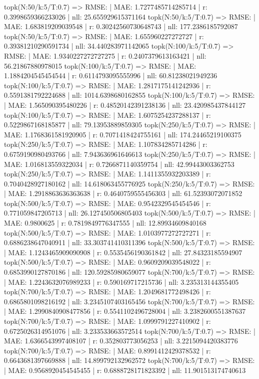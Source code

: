 topk(N:50/k:5/T:0.7) => RMSE: | MAE: 1.7277485714285714 | r: 0.3998659366233026 | nll: 25.655929615371164
topk(N:50/k:5/T:0.7) => RMSE: | MAE: 1.683819209039548 | r: 0.30242560730648743 | nll: 177.2386185792087
topk(N:50/k:5/T:0.7) => RMSE: | MAE: 1.655960227272727 | r: 0.39381210290591734 | nll: 34.440283971142065
topk(N:100/k:5/T:0.7) => RMSE: | MAE: 1.9340227272727275 | r: 0.2407379613163421 | nll: 56.21867880978015
topk(N:100/k:5/T:0.7) => RMSE: | MAE: 1.1884204545454544 | r: 0.6114793095555996 | nll: 60.81238021949236
topk(N:100/k:5/T:0.7) => RMSE: | MAE: 1.2817175141242936 | r: 0.5591381792224688 | nll: 1014.6398680162855
topk(N:100/k:5/T:0.7) => RMSE: | MAE: 1.565090395480226 | r: 0.48520142391238136 | nll: 23.420985437844127
topk(N:100/k:5/T:0.7) => RMSE: | MAE: 1.6075254237288137 | r: 0.5229867168185877 | nll: 79.13953889859305
topk(N:250/k:5/T:0.7) => RMSE: | MAE: 1.1768361581920905 | r: 0.7071418424755161 | nll: 174.24465219100375
topk(N:250/k:5/T:0.7) => RMSE: | MAE: 1.107834285714286 | r: 0.6759190980493766 | nll: 7.943636961646613
topk(N:250/k:5/T:0.7) => RMSE: | MAE: 1.016813559322034 | r: 0.7266871140359754 | nll: 42.99443003362753
topk(N:250/k:5/T:0.7) => RMSE: | MAE: 1.1411355932203389 | r: 0.7040428927180162 | nll: 14.618063455776925
topk(N:250/k:5/T:0.7) => RMSE: | MAE: 1.2918863636363638 | r: 0.4640759555456303 | nll: 61.52393072071852
topk(N:500/k:5/T:0.7) => RMSE: | MAE: 0.9542329545454546 | r: 0.771059847205713 | nll: 26.127450506805403
topk(N:500/k:5/T:0.7) => RMSE: | MAE: 0.9800625 | r: 0.7819849776347555 | nll: 12.89934609840168
topk(N:500/k:5/T:0.7) => RMSE: | MAE: 1.0103977272727271 | r: 0.6886238647040911 | nll: 33.303741410311396
topk(N:500/k:5/T:0.7) => RMSE: | MAE: 1.1243465909090908 | r: 0.5535456190361842 | nll: 27.84323185594907
topk(N:500/k:5/T:0.7) => RMSE: | MAE: 0.9609209039548022 | r: 0.6853990127870186 | nll: 120.59285980659077
topk(N:700/k:5/T:0.7) => RMSE: | MAE: 1.2243632076989233 | r: 0.590169717215736 | nll: 3.235313144355405
topk(N:700/k:5/T:0.7) => RMSE: | MAE: 1.2049681772498426 | r: 0.6865801098216192 | nll: 3.2345107403165456
topk(N:700/k:5/T:0.7) => RMSE: | MAE: 1.2990840908477856 | r: 0.5541102496728004 | nll: 3.2382600551387637
topk(N:700/k:5/T:0.7) => RMSE: | MAE: 1.0999791227410902 | r: 0.6725026314951076 | nll: 3.233533663572514
topk(N:700/k:5/T:0.7) => RMSE: | MAE: 1.6366543997408107 | r: 0.352803773056253 | nll: 3.2215094420383776
topk(N:700/k:5/T:0.7) => RMSE: | MAE: 0.8991412429378532 | r: 0.6643681397669888 | nll: 14.899792132962572
topk(N:700/k:5/T:0.7) => RMSE: | MAE: 0.9568920454545455 | r: 0.6888728171823392 | nll: 11.901513174740613
